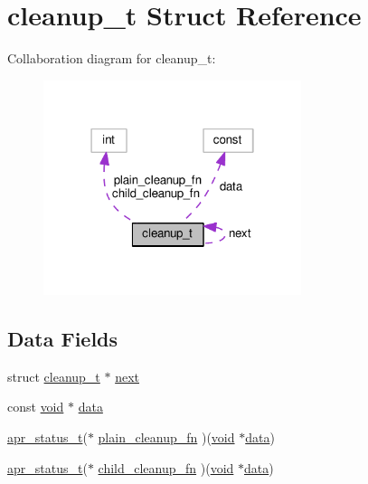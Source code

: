 \hypertarget{structcleanup__t}{}\section{cleanup\+\_\+t Struct Reference}
\label{structcleanup__t}


Collaboration diagram for cleanup\+\_\+t\+:
\nopagebreak
\begin{figure}[H]
\begin{center}
\leavevmode
\includegraphics[width=214pt]{structcleanup__t__coll__graph}
\end{center}
\end{figure}
\subsection*{Data Fields}
\begin{DoxyCompactItemize}
\item 
struct \hyperlink{structcleanup__t}{cleanup\+\_\+t} $\ast$ \hyperlink{structcleanup__t_a78e761e1c531239a90eb71bc81d38082}{next}
\item 
const \hyperlink{group__MOD__ISAPI_gacd6cdbf73df3d9eed42fa493d9b621a6}{void} $\ast$ \hyperlink{structcleanup__t_a7c8b8dee1d7c264d9860ccd68465fcb0}{data}
\item 
\hyperlink{group__apr__errno_gaa5105fa83cc322f09382292db8b47593}{apr\+\_\+status\+\_\+t}($\ast$ \hyperlink{structcleanup__t_a531f15aade37140e093acaaa1a040bc2}{plain\+\_\+cleanup\+\_\+fn} )(\hyperlink{group__MOD__ISAPI_gacd6cdbf73df3d9eed42fa493d9b621a6}{void} $\ast$\hyperlink{structdata}{data})
\item 
\hyperlink{group__apr__errno_gaa5105fa83cc322f09382292db8b47593}{apr\+\_\+status\+\_\+t}($\ast$ \hyperlink{structcleanup__t_a4c075b302ddf5ffcb7b87925de6696cf}{child\+\_\+cleanup\+\_\+fn} )(\hyperlink{group__MOD__ISAPI_gacd6cdbf73df3d9eed42fa493d9b621a6}{void} $\ast$\hyperlink{structdata}{data})
\end{DoxyCompactItemize}


